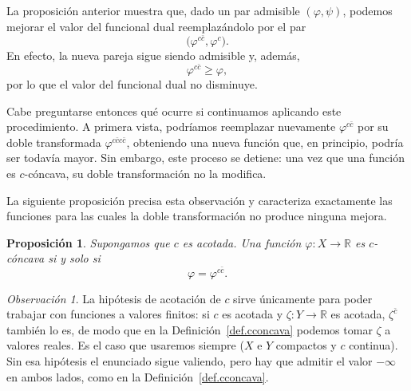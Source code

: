 \documentclass[12pt, a4paper]{amsbook}
\newcommand{\R}{{\mathbb R}}
\newtheorem{prop}[teo]{Proposición}
\theoremstyle{remark}
\newtheorem{obs}[teo]{Observación}
\theoremstyle{definition}
\numberwithin{section}{chapter}
\numberwithin{subsection}{section}
\numberwithin{equation}{section}
\numberwithin{figure}{chapter}
\begin{document}
La proposición anterior muestra que, dado un par admisible
$(\varphi,\psi)$, podemos mejorar el valor del funcional dual reemplazándolo
por el par
\[
\bigl(\varphi^{c\bar c},\varphi^c\bigr).
\]
En efecto, la nueva pareja sigue siendo admisible y, además,
\[
\varphi^{c\bar c}\geq\varphi,
\]
por lo que el valor del funcional dual no disminuye.

Cabe preguntarse entonces qué ocurre si continuamos aplicando este
procedimiento. A primera vista, podríamos reemplazar nuevamente
$\varphi^{c\bar c}$ por su doble transformada
$\varphi^{c\bar c c\bar c}$, obteniendo una nueva función que, en
principio, podría ser todavía mayor. Sin embargo, este proceso se detiene:
una vez que una función es $c$-cóncava, su doble transformación no la
modifica.

La siguiente proposición precisa esta observación y caracteriza
exactamente las funciones para las cuales la doble transformación no
produce ninguna mejora.

\begin{prop}\label{prop.cconcava.doble}
Supongamos que $c$ es acotada. Una función $\varphi\colon X\to\R$ es
$c$-cóncava si y solo si
\[
\varphi=\varphi^{c\bar c}.
\]
\end{prop}

\begin{obs}
La hipótesis de acotación de $c$ sirve únicamente para poder trabajar con
funciones a valores finitos: si $c$ es acotada y $\zeta\colon Y\to\R$ es
acotada, $\zeta^{\bar c}$ también lo es, de modo que en la
Definición~\ref{def.cconcava} podemos tomar $\zeta$ a valores reales. Es el
caso que usaremos siempre ($X$ e $Y$ compactos y $c$ continua). Sin esa
hipótesis el enunciado sigue valiendo, pero hay que admitir el valor
$-\infty$ en ambos lados, como en la Definición~\ref{def.cconcava}.
\end{obs}
\end{document}
